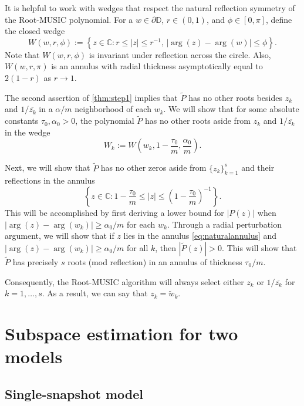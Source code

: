 \documentclass[11pt]{article}
\theoremstyle{definition}
\numberwithin{theorem}{section}
\numberwithin{equation}{section}
\def\C{\mathbb{C}}
\def\D{\mathbb{D}}
\renewcommand{\tilde}{\widetilde}
\numberwithin{equation}{section}
\begin{document}
It is helpful to work with wedges that respect the natural reflection symmetry of the Root-MUSIC polynomial. For a $w\in \partial\D$, $r \in (0,1)$, and $\phi\in [0,\pi]$, define the closed wedge
\begin{equation}
	W(w,r,\phi)
	:=\left\{z\in \C\colon r \leq |z|\leq r^{-1}, \, |\arg(z)-\arg(w)|\leq \phi \right\}. \label{eq:defwedge}
\end{equation}
Note that $W(w,r,\phi)$ is invariant under reflection across the circle. Also, $W(w,r,\pi)$ is an annulus with radial thickness asymptotically equal to $2(1-r)$ as $r\to 1$.

The second assertion of \cref{thm:step1} implies that $\tilde P$ has no other roots besides $z_k$ and $1/\overline{z_k}$ in a $\alpha/m$ neighborhood of each $w_k$. We will show that for some absolute constants $\tau_0,\alpha_0>0$, the polynomial $\tilde P$ has no other roots aside from $z_k$ and $1/\overline{z_k}$ in the wedge 
$$
W_k:=W\left(w_k, 1-\frac {\tau_0} m, \frac {\alpha_0} m\right). 
$$

Next, we will show that $\tilde P$ has no other zeros aside from $\{ z_k\}_{k=1}^s$ and their reflections in the annulus
\begin{equation}
    \label{eq:naturalannulus}
    \left\{z\in\C\colon 1-\frac {\tau_0} m \leq |z|\leq \left( 1- \frac {\tau_0} m\right)^{-1} \right\}. 
\end{equation}
This will be accomplished by first deriving a lower bound for $|P(z)|$ when $|\arg(z)-\arg(w_k)|\geq \alpha_0/m$ for each $w_k$. Through a radial perturbation argument, we will show that if $z$ lies in the annulus \eqref{eq:naturalannulus} and $|\arg(z)-\arg(w_k)|\geq \alpha_0/m$ for all $k$, then $|\tilde P(z)|>0$. This will show that $\tilde P$ has precisely $s$ roots (mod reflection) in an annulus of thickness $\tau_0/m$. 

Consequently, the Root-MUSIC algorithm will always select either $z_k$ or $1/\overline{z_k}$ for $k=1,\dots,s$. As a result, we can say that $z_k=\tilde w_k$.


\section{Subspace estimation for two models}
\label{sec:subspace}

\subsection{Single-snapshot model}
\label{sec:subspace1}
\end{document}

